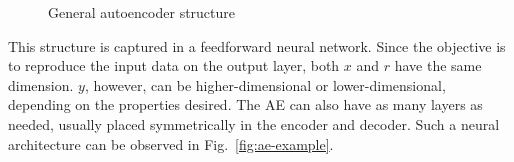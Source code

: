 \documentclass[preprint,5p,compress]{elsarticle}
\begin{document}
\begin{figure}[ht!]
\begin{center}
\end{center}
  \caption{General autoencoder structure}
  \label{fig:structure}
\end{figure}

This structure is captured in a feedforward neural network. Since the objective is to reproduce the input data on the output layer, both $x$ and $r$ have the same dimension. $y$, however, can be higher-dimensional or lower-dimensional, depending on the properties desired. The AE can also have as many layers as needed, usually placed symmetrically in the encoder and decoder. Such a neural architecture can be observed in Fig.~\ref{fig:ae-example}.
\end{document}
